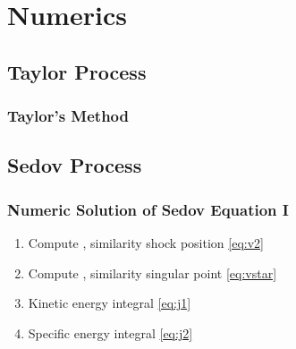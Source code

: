 % 
%

\section{Numerics}

\subsection{Taylor Process}
%
\begin{frame}\frametitle{Taylor's Method}
\end{frame}
%


\subsection{Sedov Process}
\begin{frame}\frametitle{Numeric Solution of Sedov Equation I}
\begin{enumerate}
	\item Compute , similarity shock position \eqref{eq:v2}
	\item Compute , similarity singular point \eqref{eq:vstar}
	\item Kinetic energy integral  \eqref{eq:j1}
	\item Specific energy integral  \eqref{eq:j2}
	\setcounter{algorithmCounter}{\value{enumi}}
\end{enumerate}
\end{frame}
